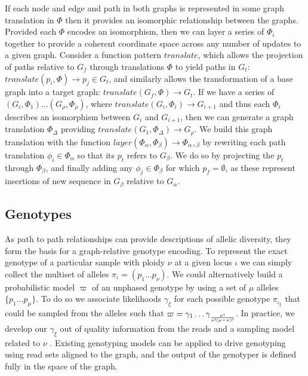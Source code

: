 If each node and edge and path in both graphs is represented in some graph translation in $\Phi$ then it provides an isomorphic relationship between the graphs.
Provided each $\Phi$ encodes an isomorphism, then we can layer a series of $\Phi_i$ together to provide a coherent coordinate space across any number of updates to a given graph.
Consider a function pattern $translate$, which allows the projection of paths relative to $G_f$ through translations $\Phi$ to yield paths in $G_t$: $translate(p_i, \Phi) \to p_j \in G_t$, and similarly allows the transformation of a base graph into a target graph: $translate(G_f, \Phi) \to G_t$.
If we have a series of $(G_i, \Phi_1) \ldots (G_\rho, \Phi_\rho)$, where $translate(G_i, \Phi_i) \to G_{i+1}$ and thus each $\Phi_i$ describes an isomorphism between $G_i$ and $G_{i+1}$, then we can generate a graph translation $\Phi_\Delta$ providing $translate(G_1, \Phi_\Delta) \to G_\rho$.
We build this graph translation with the function $layer(\Phi_\alpha, \Phi_\beta) \to \Phi_{\alpha \circ \beta}$ by rewriting each path translation $\phi_i \in \Phi_\alpha$ so that its $p_t$ refers to $G_\beta$.
We do so by projecting the $p_t$ through $\Phi_\beta$, and finally adding any $\phi_j \in \Phi_\beta$ for which $p_f = \emptyset$, as these represent insertions of new sequence in $G_\beta$ relative to $G_\alpha$.

\subsection{Genotypes}
\label{sec:genotypes}

As path to path relationships can provide descriptions of allelic diversity, they form the basis for a graph-relative genotype encoding.
To represent the exact genotype of a particular sample with ploidy $\nu$ at a given locus $\iota$ we can simply collect the multiset of alleles $\pi_\iota = ( p_1 \ldots p_\nu)$.
We could alternatively build a probabilistic model $\varpi$ of an unphased genotype by using a set of $\mu$ alleles $\{ p_1 \ldots p_\mu\}$.
To do so we associate likelihoods $\gamma_\xi$ for each possible genotype $\pi_{\iota_\xi}$ that could be sampled from the alleles such that $\varpi = \gamma_1 \ldots \gamma_{\mu! \over{\nu!(\mu-\nu)!} }$.
In practice, we develop our $\gamma_\xi$ out of quality information from the reads and a sampling model related to $\nu$ \cite{garrison2012haplotype,li2011statistical}.
Existing genotyping models can be applied to drive genotyping using read sets aligned to the graph, and the output of the genotyper is defined fully in the space of the graph.

